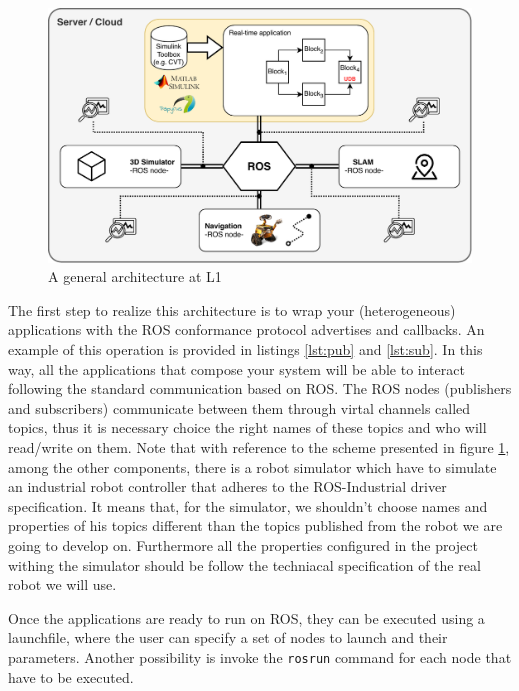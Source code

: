 \begin{figure}[htbp]
	\centering
	\includegraphics[width=\textwidth]{images/L1-arch}
	\caption{A general architecture at L1}
	\label{fig:l1arch}
\end{figure}

The first step to realize this architecture is to wrap your (heterogeneous) applications with the ROS conformance protocol advertises and callbacks. An example of this operation is provided in listings \ref{lst:pub} and \ref{lst:sub}.
In this way, all the applications that compose your system will be able to interact following the standard communication based on ROS.
The ROS nodes (publishers and subscribers) communicate between them through virtal channels called topics, thus it is necessary choice the right names of these topics and who will read/write on them.
Note that with reference to the  scheme presented in figure \ref{fig:l1arch}, among the other components, there is a robot simulator which have to simulate an industrial robot controller that adheres to the ROS-Industrial driver specification. It means that, for the simulator, we shouldn't choose names and properties of his topics different than the topics published from the robot we are going to develop on. Furthermore all the properties configured in the project withing the simulator should be follow the techniacal specification of the real robot we will use.

Once the applications are ready to run on ROS, they can be executed using a launchfile, where the user can specify a set of nodes to launch and their parameters.
Another possibility is invoke the \texttt{rosrun} command for each node that have to be executed.


